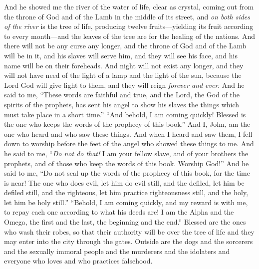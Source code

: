 \begin{biblechapter} %
 And he showed me the river of the water of life, clear as crystal, coming out from the throne of God and of the Lamb
\verse in the middle of its street, and \textit{on both sides of the river} is the tree of life, producing twelve fruits—yielding its fruit according to every month—and the leaves of the tree are for the healing of the nations.
\verse And there will not be any curse any longer, and the throne of God and of the Lamb will be in it, and his slaves will serve him,
\verse and they will see his face, and his name will be on their foreheads.
\verse And night will not exist any longer, and they will not have need of the light of a lamp and the light of the sun, because the Lord God will give light to them, and they will reign \textit{forever and ever}.
 And he said to me, “These words are faithful and true, and the Lord, the God of the spirits of the prophets, has sent his angel to show his slaves the things which must take place in a short time.”
\verse “And behold, I am coming quickly! Blessed is the one who keeps the words of the prophecy of this book.”
\verse And I, John, am the one who heard and who saw these things. And when I heard and saw them, I fell down to worship before the feet of the angel who showed these things to me.
\verse And he said to me, “\textit{Do not do that!} I am your fellow slave, and of your brothers the prophets, and of those who keep the words of this book. Worship God!”
\verse And he said to me, “Do not seal up the words of the prophecy of this book, for the time is near!
\verse The one who does evil, let him do evil still, and the defiled, let him be defiled still, and the righteous, let him practice righteousness still, and the holy, let him be holy still.”
\verse “Behold, I am coming quickly, and my reward is with me, to repay each one according to what his deeds are!
\verse I am the Alpha and the Omega, the first and the last, the beginning and the end.”
\verse Blessed are the ones who wash their robes, so that their authority will be over the tree of life and they may enter into the city through the gates.
\verse Outside are the dogs and the sorcerers and the sexually immoral people and the murderers and the idolaters and everyone who loves and who practices falsehood.

\end{biblechapter}
